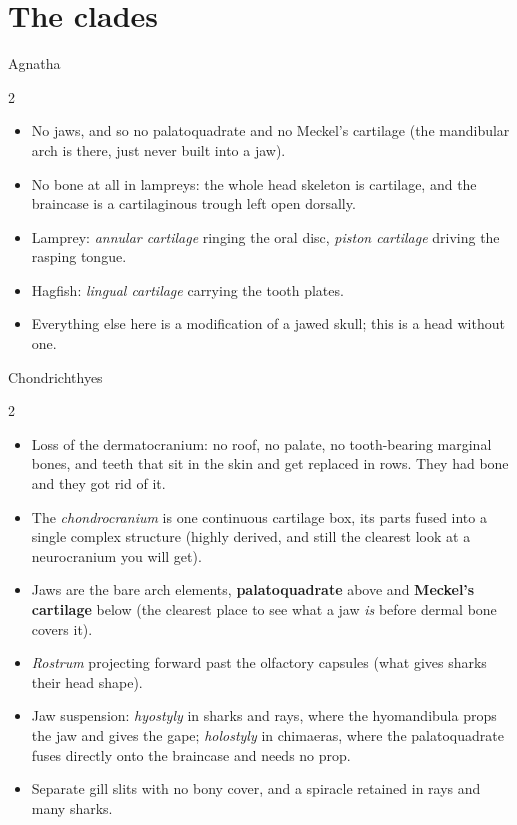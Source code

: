\documentclass[11pt]{article}
\newcommand{\bone}[1]{\textbf{#1}}
\newcommand{\term}[1]{\textsl{#1}}
\begin{document}
\clearpage

\clearpage
\section{The clades}

\begin{cladebox}{Agnatha}
\begin{multicols}{2}
\begin{itemize}
\item No jaws, and so no palatoquadrate and no Meckel's cartilage (the mandibular
  arch is there, just never built into a jaw).
\item No bone at all in lampreys: the whole head skeleton is cartilage, and the
  braincase is a cartilaginous trough left open dorsally.
\item Lamprey: \term{annular cartilage} ringing the oral disc, \term{piston
  cartilage} driving the rasping tongue.
\item Hagfish: \term{lingual cartilage} carrying the tooth plates.
\item Everything else here is a modification of a jawed skull; this is a head
  without one.
\end{itemize}
\end{multicols}
\end{cladebox}

\begin{cladebox}{Chondrichthyes}
\begin{multicols}{2}
\begin{itemize}
\item Loss of the dermatocranium: no roof, no palate, no tooth-bearing
  marginal bones,
  and teeth that sit in the skin and get replaced in rows. They had bone and they
  got rid of it.
\item The \term{chondrocranium} is one continuous cartilage box, its parts fused
  into a single complex structure (highly derived, and still the clearest look at a neurocranium you will get).
\item Jaws are the bare arch elements, \bone{palatoquadrate} above and
  \bone{Meckel's cartilage} below (the clearest place to see what a jaw
  \emph{is} before dermal bone covers it).
\item \term{Rostrum} projecting forward past the olfactory capsules (what gives
  sharks their head shape).
\item Jaw suspension: \term{hyostyly} in sharks and rays, where the
  hyomandibula props the jaw and gives the gape;
  \term{holostyly} in chimaeras, where the palatoquadrate fuses directly onto the braincase and needs no prop.
\item Separate gill slits with no bony cover, and a spiracle retained in rays and
  many sharks.
\end{itemize}
\end{multicols}
\end{cladebox}
\end{document}
